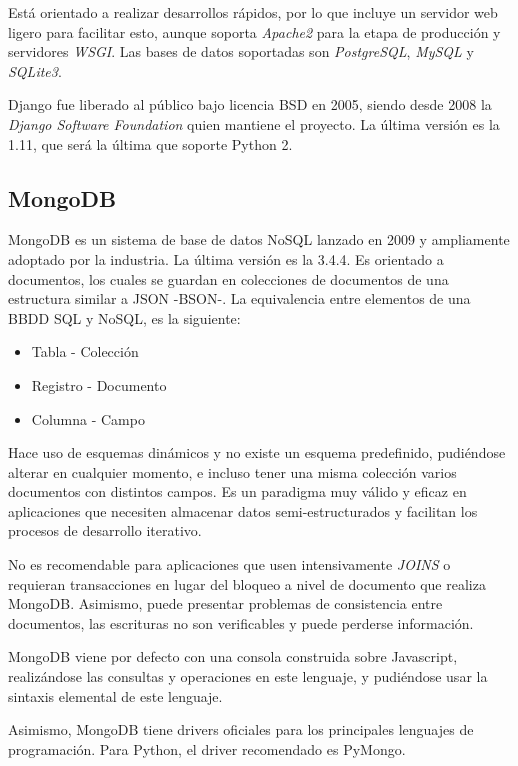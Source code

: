 Está orientado a realizar desarrollos rápidos, por lo que incluye un servidor web ligero para facilitar esto, aunque soporta \textit{Apache2} para la etapa de producción y servidores \textit{WSGI}. Las bases de datos soportadas son \textit{PostgreSQL}, \textit{MySQL} y \textit{SQLite3}.


Django fue liberado al público bajo licencia BSD en 2005, siendo desde 2008 la \textit{Django Software Foundation} quien mantiene el proyecto. La última versión es la 1.11, que será la última que soporte Python 2.


\subsection{MongoDB} 
\label{sec:mongodb}


MongoDB es un sistema de base de datos NoSQL lanzado en 2009 y ampliamente adoptado por la industria. La última versión es la 3.4.4. Es orientado a documentos, los cuales se guardan en colecciones de documentos de una estructura similar a JSON -BSON-.  La equivalencia entre elementos de una BBDD SQL y NoSQL, es la siguiente:

\begin{itemize}
\item Tabla - Colección

\item Registro - Documento

\item Columna - Campo
\end{itemize}


Hace uso de esquemas dinámicos y no existe un esquema predefinido, pudiéndose alterar en cualquier momento, e incluso tener una misma colección varios documentos con distintos campos. Es un paradigma muy válido y eficaz en aplicaciones que necesiten almacenar datos semi-estructurados y facilitan los procesos de desarrollo iterativo.


No es recomendable para aplicaciones que usen intensivamente \textit{JOINS} o requieran transacciones en lugar del bloqueo a nivel de documento que realiza MongoDB. Asimismo, puede presentar problemas de consistencia entre documentos, las escrituras no son verificables y puede perderse información.


MongoDB viene por defecto con una consola construida sobre Javascript, realizándose las consultas y operaciones en este lenguaje, y pudiéndose usar la sintaxis elemental de este lenguaje.


Asimismo, MongoDB tiene drivers oficiales para los principales lenguajes de programación. Para Python, el driver recomendado es PyMongo.


